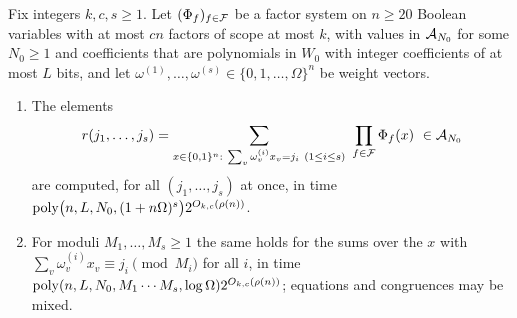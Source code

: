 \begin{theorem}\label{thm:linear}
Fix integers $k,c,s\ge1$. Let $(\Phi_f)_{f\in\mathcal{F}}$ be a factor system on $n\ge20$
Boolean variables with at most $cn$ factors of scope at most $k$, with values in
$\mathcal{A}_{N_0}$ for some $N_0\ge1$ and coefficients that are polynomials in $W_0$ with
integer coefficients of at most $L$ bits, and let
$\omega^{(1)},\dots,\omega^{(s)}\in\{0,1,\dots,\Omega\}^n$ be weight vectors.
\begin{enumerate}[label=\textup{(\roman*)},leftmargin=2.2em]
\item\label{it:lineq} The elements
\[
  r(j_1,\dots,j_s)=\sum_{x\in\{0,1\}^n:\ \sum_v\omega^{(i)}_vx_v=j_i\ (1\le i\le s)}
  \ \prod_{f\in\F}\Phi_f(x)\ \in\A_{N_0}
\]
are computed, for all $(j_1,\dots,j_s)$ at once, in time
$\operatorname{poly}\bigl(n,L,N_0,(1+n\Omega)^s\bigr)2^{O_{k,c}(\rho(n))}$.
\item\label{it:lincong} For moduli $M_1,\dots,M_s\ge1$ the same holds for the
sums over the $x$ with $\sum_v\omega^{(i)}_vx_v\equiv j_i\pmod{M_i}$ for all $i$,
in time $\operatorname{poly}(n,L,N_0,M_1\cdots M_s,\log\Omega)2^{O_{k,c}(\rho(n))}$; equations
and congruences may be mixed.
\end{enumerate}
\end{theorem}

